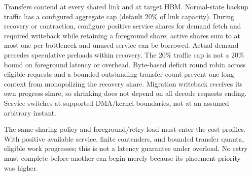 Transfers contend at every shared link and at target HBM. Normal-state
backup traffic has a configured aggregate cap (default 20\% of link
capacity). During recovery or contraction, configure positive service
shares for demand fetch and required writeback while retaining a foreground
share; active shares sum to at most one per bottleneck and unused service
can be borrowed. Actual demand precedes speculative preloads within recovery.
The 20\% traffic cap is not a 20\% bound on foreground latency or overhead.
Byte-based deficit round robin across eligible requests and a bounded
outstanding-transfer count prevent one long context from monopolizing
the recovery share. Migration writeback receives its own progress share,
so shrinking does not depend on all decode requests ending. Service switches
at supported DMA/kernel boundaries, not at an assumed arbitrary instant.

The same sharing policy and foreground/retry load must enter the cost
profiles. With positive available service, finite contenders, and bounded
transfer quanta, eligible work progresses; this is not a latency guarantee
under overload. No retry must complete before another can begin merely
because its placement priority was higher.
